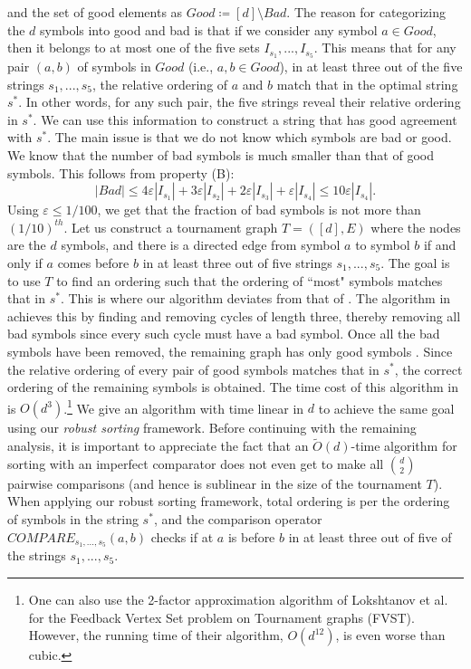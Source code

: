 \documentclass[11pt]{llncs}
\newcommand{\veps}{\varepsilon}
\begin{document}
and the set of good elements as $Good \coloneqq [d]\setminus Bad$.
The reason for categorizing the $d$ symbols into good and bad is that if we consider any symbol $a \in Good$, then it belongs to at most one of the five sets $I_{s_1}, ..., I_{s_5}$. 
This means that for any pair $(a, b)$ of symbols in $Good$ (i.e., $a, b \in Good$), in at least three out of the five strings $s_{1}, ..., s_{5}$, the relative ordering of $a$ and $b$ match that in the optimal string $s^*$. In other words, for any such pair, the five strings reveal their relative ordering in $s^*$. We can use this information to construct a string that has good agreement with $s^*$. 
The main issue is that we do not know which symbols are bad or good. 
We know that the number of bad symbols is much smaller than that of good symbols. This follows from property (B):
$$
|Bad| \leq 4 \veps |I_{s_1}| + 3 \veps |I_{s_2}| + 2 \veps |I_{s_3}| + \veps |I_{s_4}| \leq 10 \veps |I_{s_4}|.
$$
Using $\veps \leq 1/100$, we get that the fraction of bad symbols is not more than $(1/10)^{th}$.
Let us construct a tournament graph $T = ([d], E)$ where the nodes are the $d$ symbols, and there is a directed edge from symbol $a$ to symbol $b$ if and only if $a$ comes before $b$ in at least three out of five strings $s_{1}, ..., s_{5}$. The goal is to use $T$ to find an ordering such that the ordering of ``most" symbols matches that in $s^*$. This is where our algorithm deviates from that of \cite{cdk23}. 
The algorithm in \cite{cdk23} achieves this by finding and removing cycles of length three, thereby removing all bad symbols since every such cycle must have a bad symbol. Once all the bad symbols have been removed, the remaining graph has only good symbols . Since the relative ordering of every pair of good symbols matches that in $s^*$, the correct ordering of the remaining symbols is obtained. The time cost of this algorithm in \cite{cdk23} is $O(d^3)$.\footnote{One can also use the 2-factor approximation algorithm of Lokshtanov et al.~\cite{fvst} for the Feedback Vertex Set problem on Tournament graphs (FVST). However, the running time of their algorithm, $O(d^{12})$, is even worse than cubic.}
We give an algorithm with time linear in $d$ to achieve the same goal using our {\em robust sorting} framework. 
Before continuing with the remaining analysis, it is important to appreciate the fact that an $\tilde{O}(d)$-time algorithm for sorting with an imperfect comparator does not even get to make all $\binom{d}{2}$ pairwise comparisons (and hence is sublinear in the size of the tournament $T$).
When applying our robust sorting framework, total ordering is per the ordering of symbols in the string $s^*$, and the comparison operator {\tt $COMPARE_{s_{1}, ..., s_{5}}(a, b)$} checks if at $a$ is before $b$ in at least three out of five of the strings $s_{1}, ..., s_{5}$.
\end{document}
